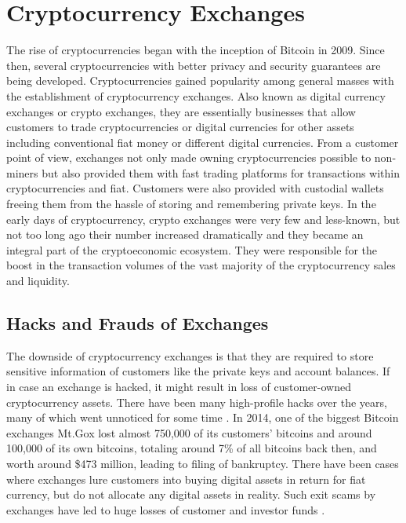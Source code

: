 \section{Cryptocurrency Exchanges}

The rise of cryptocurrencies began with the inception of Bitcoin in 2009. Since
then, several cryptocurrencies with better privacy and security guarantees are being
developed. Cryptocurrencies gained popularity among general masses with the establishment of cryptocurrency exchanges.
Also known as digital currency exchanges or crypto exchanges, they are essentially businesses that allow customers to trade
cryptocurrencies or digital currencies for other assets including conventional fiat
money or different digital currencies. 
From a customer point of view, exchanges not only made owning cryptocurrencies possible to non-miners but also provided them with fast trading platforms for transactions within cryptocurrencies and fiat.
Customers were also provided with custodial wallets freeing them from the hassle of storing and remembering private keys.
In the early days of cryptocurrency, crypto exchanges were very few and less-known, but not too long ago their number increased dramatically and they became an integral part of the cryptoeconomic ecosystem. 
They were responsible for the boost in the transaction volumes of the vast majority of the cryptocurrency sales and liquidity.

\subsection{Hacks and Frauds of Exchanges}

The downside of cryptocurrency exchanges is that they are required to
store sensitive information of customers like the private keys and account balances.
If in case an exchange is hacked, it might result in loss of customer-owned cryptocurrency assets.
There have been many high-profile hacks over the years, many of which went unnoticed for some time \cite{Cryptohacks}.
In 2014, one of the biggest Bitcoin exchanges Mt.Gox lost almost 750,000 of its customers' bitcoins and around 100,000 of its own bitcoins, totaling around 7\% of all bitcoins back then, and worth around \$473 million, leading to filing of bankruptcy.
There have been cases where exchanges lure customers into buying digital assets in return for fiat currency, but do not allocate any digital assets in reality.
Such exit scams by exchanges have led to huge losses of customer and investor funds \cite{Robert2020}.

